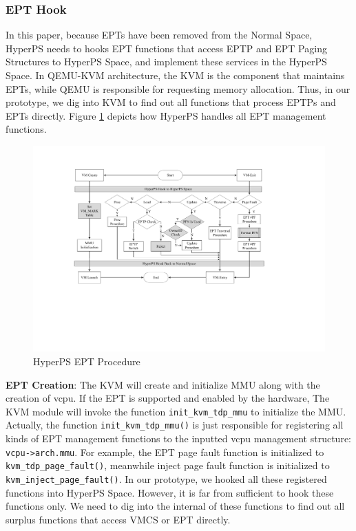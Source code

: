 \subsubsection{EPT Hook}%
\label{ssub:ept_hook}


In this paper, because EPTs have been removed from the Normal Space, 
HyperPS needs to hooks EPT functions that access EPTP and EPT Paging Structures to HyperPS Space, and implement these services in the HyperPS Space.
In QEMU-KVM architecture, the KVM is the component that maintains EPTs, while QEMU is responsible for requesting memory allocation.
Thus, in our prototype, we dig into KVM to find out all functions that process EPTPs and EPTs directly. Figure \ref{fig:impept} depicts how HyperPS handles all EPT management functions. 

\begin{figure}[htpb]
    \centering
    \includegraphics[width=0.8\linewidth]{./IMG/imp-ept-handle.pdf}
    \caption{HyperPS EPT Procedure}%
    \label{fig:impept}
\end{figure}

\textbf{EPT Creation}: The KVM will create and initialize MMU along with the creation of vcpu. 
If the EPT is supported and enabled by the hardware, The KVM module will invoke the function \verb|init_kvm_tdp_mmu| to initialize the MMU. 
Actually, the function \verb|init_kvm_tdp_mmu()| is just responsible for registering all kinds of EPT management functions to the inputted vcpu management structure: \verb|vcpu->arch.mmu|. 
For example, the EPT page fault function is initialized to \verb|kvm_tdp_page_fault()|, meanwhile inject page fault function is initialized to \verb|kvm_inject_page_fault()|. 
In our prototype, we hooked all these registered functions into HyperPS Space. However, it is far from sufficient to hook these functions only. We need to dig into the internal of these functions to find out all surplus functions that access VMCS or EPT directly.

